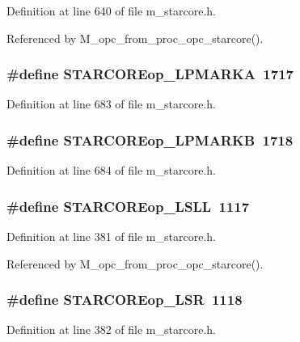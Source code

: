 Definition at line 640 of file m\_\-starcore.h.

Referenced by M\_\-opc\_\-from\_\-proc\_\-opc\_\-starcore().
\subsubsection{\setlength{\rightskip}{0pt plus 5cm}\#define STARCOREop\_\-LPMARKA~1717}\label{m__starcore_8h_fd40b6c55ef60a2aa031ab3fc23dd503}




Definition at line 683 of file m\_\-starcore.h.
\subsubsection{\setlength{\rightskip}{0pt plus 5cm}\#define STARCOREop\_\-LPMARKB~1718}\label{m__starcore_8h_efc1cc398f84fb9abf9e1e4c5b7435a2}




Definition at line 684 of file m\_\-starcore.h.
\subsubsection{\setlength{\rightskip}{0pt plus 5cm}\#define STARCOREop\_\-LSLL~1117}\label{m__starcore_8h_fecfabd74a1b4c0ced09b164f3241438}




Definition at line 381 of file m\_\-starcore.h.

Referenced by M\_\-opc\_\-from\_\-proc\_\-opc\_\-starcore().
\subsubsection{\setlength{\rightskip}{0pt plus 5cm}\#define STARCOREop\_\-LSR~1118}\label{m__starcore_8h_d7b79014cbb8ffa24bcd61590181ad52}




Definition at line 382 of file m\_\-starcore.h.

